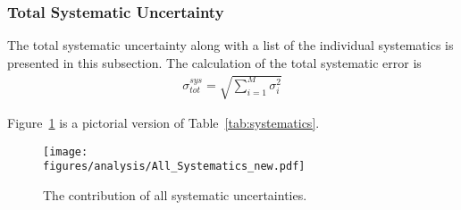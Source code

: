 \subsubsection{Total Systematic Uncertainty}
The total systematic uncertainty along with a list of the individual systematics is presented in this subsection. The calculation of the total systematic error is 
\begin{align}
\sigma^{sys}_{tot} = \sqrt{\sum_{i=1}^{M}\sigma_i^2}
\end{align}

Figure~\ref{fig:results.syserr} is a pictorial version of Table~\ref{tab:systematics}.
\begin{figure}[h!]\begin{center}
\texttt{[image: \\figures/analysis/All\_Systematics\_new.pdf]}
\caption[The contribution of all systematic uncertainties]{\label{fig:results.syserr}The contribution of all systematic uncertainties.}
\end{center}\end{figure}
\FloatBarrier
